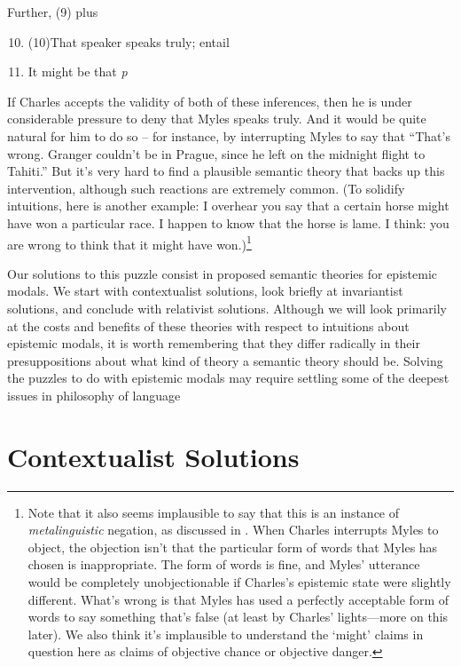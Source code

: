 \noindent Further, (9) plus

\begin{enumerate}
\setcounter{enumi}{9}
 
\item (10)That speaker speaks truly; entail
\item It might be that \textit{p}
\end{enumerate}
 
If Charles accepts the validity of both of these inferences, then he is under considerable pressure to deny that Myles speaks truly. And it would be quite natural for him to do so -- for instance, by interrupting Myles to say that ``That's wrong. Granger couldn't be in Prague, since he left on the midnight flight to Tahiti.'' But it's very hard to find a plausible semantic theory that backs up this intervention, although such reactions are extremely common. (To solidify intuitions, here is another example: I overhear you say that a certain horse might have won a particular race. I happen to know that the horse is lame. I think: you are wrong to think that it might have won.)\footnote{Note that it also seems implausible to say that this is an instance of \textit{metalinguistic} negation, as discussed in \citet{Horn1989}. When Charles interrupts Myles to object, the objection isn't that the particular form of words that Myles has chosen is inappropriate. The form of words is fine, and Myles' utterance would be completely unobjectionable if Charles's epistemic state were slightly different. What's wrong is that Myles has used a perfectly acceptable form of words to say something that's false (at least by Charles' lights---more on this later). We also think it's implausible to understand the `might' 
claims in question here as claims of objective chance or objective danger.} 
 
Our solutions to this puzzle consist in proposed semantic theories for epistemic modals. We start with contextualist solutions, look briefly at invariantist solutions, and conclude with relativist solutions. Although we will look primarily at the costs and benefits of these theories with respect to intuitions about epistemic modals, it is worth remembering that they differ radically in their presuppositions about what kind of theory a semantic theory should be. Solving the puzzles to do with epistemic modals may require settling some of the 
deepest issues in philosophy of language 
 
\section{Contextualist Solutions} 
 

